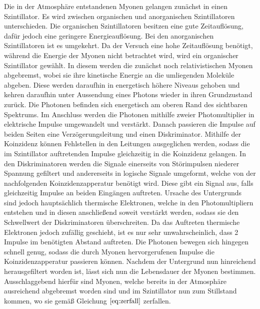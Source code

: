  Die in der Atmosphäre entstandenen Myonen gelangen zunächst in einen Szintillator. Es wird zwischen organischen und anorganischen Szintillatoren unterschieden. Die organischen Szintillatoren besitzen eine gute Zeitauflösung, dafür jedoch eine geringere Energieauflösung. Bei den anorganischen Szintillatoren ist es umgekehrt. Da der Versuch eine hohe Zeitauflösung benötigt, während die Energie der Myonen nicht betrachtet wird, wird ein organischer Szintillator gewählt. In diesem werden die zunächst noch relativistischen Myonen abgebremst, wobei sie ihre kinetische Energie an die umliegenden Moleküle abgeben. Diese werden daraufhin in energetisch höhere Niveaus gehoben und kehren daraufhin unter Aussendung eines Photons wieder in ihren Grundzustand zurück. Die Photonen befinden sich energetisch am oberen Rand des sichtbaren Spektrums. Im Anschluss werden die Photonen mithilfe zweier Photomultiplier in elektrische Impulse umgewandelt und verstärkt.
   Danach passieren die Impulse auf beiden Seiten eine Verzögerungsleitung und einen Diskriminator. Mithilfe der Koinzidenz können Fehlstellen in den Leitungen ausgeglichen werden, sodass die im Szintillator auftretenden Impulse gleichzeitig in die Koinzidenz gelangen. In den Diskriminatoren werden die Signale einerseits von Störimpulsen niederer Spannung gefiltert und andererseits in logische Signale umgeformt, welche von der nachfolgenden Koinzidenzapperatur benötigt wird.
     Diese gibt ein Signal aus, falls gleichzeitig Impulse an beiden Eingängen auftreten. Ursache des Untergrunds sind jedoch hauptsächlich thermische Elektronen, welche in den Photomultipliern entstehen und in diesen anschließend soweit verstärkt werden, sodass sie den Schwellwert der Diskriminatoren überschreiten. Da das Auftreten thermische Elektronen jedoch zufällig geschieht, ist es nur sehr unwahrscheinlich, dass 2 Impulse im benötigten
     Abstand auftreten. Die Photonen bewegen sich hingegen schnell genug, sodass die durch Myonen hervorgerufenen Impulse die Koinzidenzapperatur passieren können.
   Nachdem der Untergrund nun hinreichend herausgefiltert worden ist, lässt sich nun die Lebensdauer der Myonen bestimmen. Ausschlaggebend hierfür sind Myonen, welche bereits in der Atmosphäre ausreichend abgebremst worden sind und im Szintillator nun zum Stillstand kommen, wo sie gemäß Gleichung $\eqref{eq:zerfall}$ zerfallen.
